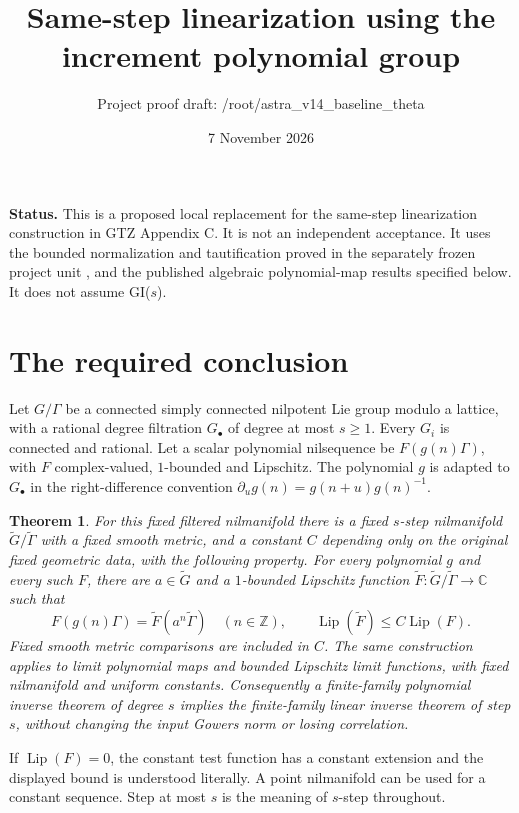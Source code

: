 \documentclass[11pt]{article}
\title{Same-step linearization using the increment polynomial group}
\author{Project proof draft: /root/astra\_v14\_baseline\_theta}
\date{7 November 2026}
\newtheorem{theorem}{Theorem}
\newcommand{\Z}{\mathbb Z}
\begin{document}
\maketitle

\noindent\textbf{Status.} This is a proposed local replacement for the
same-step linearization construction in GTZ Appendix C. It is not an
independent acceptance. It uses the bounded normalization and tautification
proved in the separately frozen project unit \cite{Taut}, and the published
algebraic polynomial-map results specified below. It does not assume GI($s$).

\section{The required conclusion}

Let $G/\Gamma$ be a connected simply connected nilpotent Lie group modulo a
lattice, with a rational degree filtration $G_\bullet$ of degree at most
$s\geq1$. Every $G_i$ is connected and rational. Let a scalar polynomial
nilsequence be $F(g(n)\Gamma)$, with $F$ complex-valued, $1$-bounded and
Lipschitz. The polynomial $g$ is adapted to $G_\bullet$ in the right-difference
convention $\partial_u g(n)=g(n+u)g(n)^{-1}$.

\begin{theorem}\label{thm:linear}
For this fixed filtered nilmanifold there is a fixed $s$-step nilmanifold
$\widetilde G/\widetilde\Gamma$ with a fixed smooth metric, and a constant
$C$ depending only on the original fixed geometric data, with the following
property. For every polynomial $g$ and every such $F$, there are
$a\in\widetilde G$ and a $1$-bounded Lipschitz function
$\widetilde F:\widetilde G/\widetilde\Gamma\longrightarrow\mathbb C$ such that
\[
 F(g(n)\Gamma)=\widetilde F(a^n\widetilde\Gamma)
 \quad(n\in\Z),\qquad
 \operatorname{Lip}(\widetilde F)\leq C\operatorname{Lip}(F).
\]
Fixed smooth metric comparisons are included in $C$.
The same construction applies to limit polynomial maps and bounded
Lipschitz limit functions, with fixed nilmanifold and uniform constants.
Consequently a finite-family polynomial inverse theorem of degree $s$
implies the finite-family linear inverse theorem of step $s$, without
changing the input Gowers norm or losing correlation.
\end{theorem}

If $\operatorname{Lip}(F)=0$, the constant test function has a constant
extension and the displayed bound is understood literally. A point
nilmanifold can be used for a constant sequence. Step at most $s$ is the
meaning of $s$-step throughout.
\end{document}
